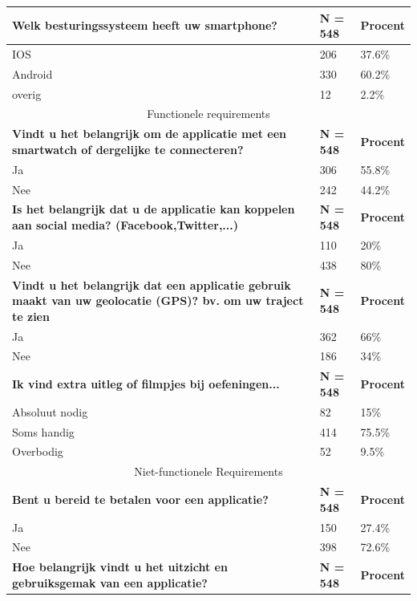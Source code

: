 \vspace{1cm}
\begin{table}[h!]
\begin{center}
\begin{tabular}{ |p{10cm}|p{2cm}|p{2cm}| }
 \hline
    \textbf{Welk besturingssysteem heeft uw smartphone?} & \textbf{N = 548} &\textbf{Procent}\\ 
 \hline
IOS   & 206    &37.6\%   \\
Android &   330  &60.2\%   \\
overig &   12  &2.2\%   \\
 \hline
 \multicolumn{3}{|c|}{Functionele requirements} \\
 \hline
     \textbf{Vindt u het belangrijk om de applicatie met een smartwatch of dergelijke te connecteren?} & \textbf{N = 548} &\textbf{Procent}\\ 
 \hline
Ja   & 306    &55.8\%   \\
Nee &   242  &44.2\%   \\
 \hline
     \textbf{Is het belangrijk dat u de applicatie kan koppelen aan social media? (Facebook,Twitter,...)} & \textbf{N = 548} &\textbf{Procent}\\ 
 \hline
Ja   & 110    &20\%   \\
Nee &   438  &80\%   \\
 \hline
      \textbf{Vindt u het belangrijk dat een applicatie gebruik maakt van uw geolocatie (GPS)? bv. om uw traject te zien} & \textbf{N = 548} &\textbf{Procent}\\ 
 \hline
Ja   & 362    &66\%   \\
Nee &   186  &34\%   \\
 \hline
       \textbf{Ik vind extra uitleg of filmpjes bij oefeningen...} & \textbf{N = 548} &\textbf{Procent}\\ 
 \hline
Absoluut nodig   & 82    &15\%   \\
Soms handig &   414  &75.5\%   \\
Overbodig &   52  &9.5\%   \\
  \hline
 \multicolumn{3}{|c|}{Niet-functionele Requirements} \\
 \hline
        \textbf{Bent u bereid te betalen voor een applicatie?} & \textbf{N = 548} &\textbf{Procent}\\ 
 \hline
Ja   & 150    &27.4\%   \\
Nee &   398  &72.6\%   \\
 \hline
         \textbf{Hoe belangrijk vindt u het uitzicht en gebruiksgemak van een applicatie?} & \textbf{N = 548} &\textbf{Procent}\\ 

\end{tabular}
\end{center}
\end{table}
